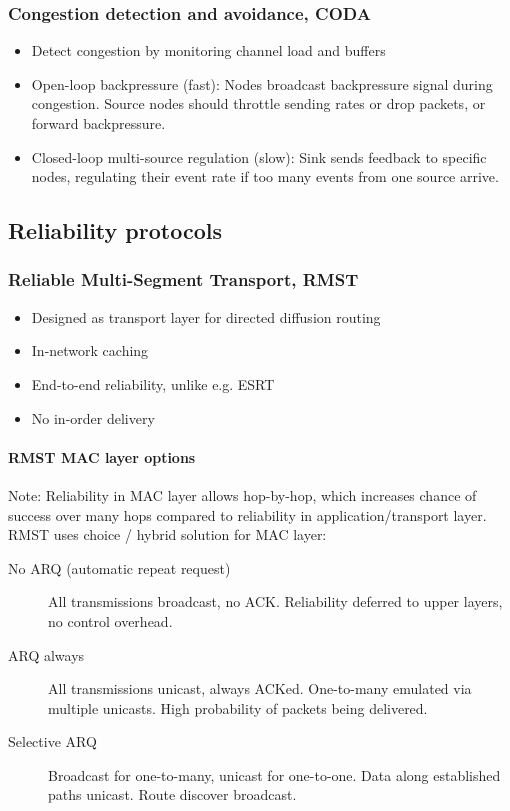 \subsubsection{Congestion detection and avoidance, CODA}

\begin{itemize}
		\item Detect congestion by monitoring channel load and buffers
		\item Open-loop backpressure (fast): Nodes broadcast backpressure
				signal during congestion. Source nodes should throttle sending
				rates or drop packets, or forward backpressure.
		\item Closed-loop multi-source regulation (slow): Sink sends feedback
				to specific nodes, regulating their event rate if too many
				events from one source arrive.
\end{itemize}

\subsection{Reliability protocols}

\subsubsection{Reliable Multi-Segment Transport, RMST}

\begin{itemize}
		\item Designed as transport layer for directed diffusion routing
		\item In-network caching
		\item End-to-end reliability, unlike e.g. ESRT
		\item No in-order delivery
\end{itemize}


\paragraph{RMST MAC layer options}

Note: Reliability in MAC layer allows hop-by-hop, which increases chance of
success over many hops compared to reliability in application/transport layer.
RMST uses choice / hybrid solution for MAC layer:

\begin{description}
		\item[No ARQ (automatic repeat request)] All transmissions broadcast,
				no ACK. Reliability deferred to upper layers, no control
				overhead.
		\item[ARQ always] All transmissions unicast, always ACKed. One-to-many
				emulated via multiple unicasts. High probability of packets
				being delivered.
		\item[Selective ARQ] Broadcast for one-to-many, unicast for one-to-one. Data along established paths unicast. Route discover broadcast.
\end{description}

